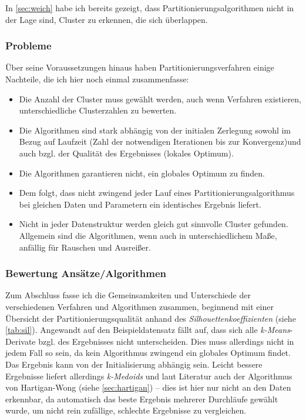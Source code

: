 \documentclass[a4paper,12pt,twoside]{article}
\newcommand{\Fachbegriff}[1]{\textit{#1}}
\begin{document}
In \ref{sec:weich} habe ich bereits gezeigt, dass Partitionierungsalgorithmen nicht in der Lage sind, Cluster zu erkennen, die sich überlappen.

\subsubsection{Probleme}
Über seine Voraussetzungen hinaus haben Partitionierungsverfahren einige Nachteile, die ich hier noch einmal zusammenfasse:
\begin{itemize}
\item Die Anzahl der Cluster muss gewählt werden, auch wenn Verfahren existieren, unterschiedliche Clusterzahlen zu bewerten.
\item Die Algorithmen sind stark abhängig von der initialen Zerlegung sowohl im Bezug auf Laufzeit (Zahl der notwendigen Iterationen bis zur Konvergenz)und auch bzgl. der Qualität des Ergebnisses (lokales Optimum).
\item Die Algorithmen garantieren nicht, ein globales Optimum zu finden.
\item Dem folgt, dass nicht zwingend jeder Lauf eines Partitionierungsalgorithmus bei gleichen Daten und Parametern ein identisches Ergebnis liefert. 
\item Nicht in jeder Datenstruktur werden gleich gut sinnvolle Cluster gefunden. Allgemein sind die Algorithmen, wenn auch in unterschiedlichem Maße, anfällig für Rauschen und Ausreißer.
\end{itemize}

\subsubsection{Bewertung Ansätze/Algorithmen}
Zum Abschluss fasse ich die Gemeinsamkeiten und Unterschiede der verschiedenen Verfahren und Algorithmen zusammen, beginnend mit einer Übersicht der Partitionierungsqualität anhand des \Fachbegriff{Silhouettenkoeffizienten} (siehe \autoref{tab:sil}). Angewandt auf den Beispieldatensatz fällt auf, dass sich alle \Fachbegriff{k-Means}-Derivate bzgl. des Ergebnisses nicht unterscheiden. Dies muss allerdings nicht in jedem Fall so sein, da  kein Algorithmus zwingend ein globales Optimum findet. Das Ergebnis kann von der Initialisierung abhängig sein. Leicht bessere Ergebnisse liefert allerdings \Fachbegriff{k-Medoids} und laut Literatur auch der Algorithmus von Hartigan-Wong (siehe \autoref{sec:hartigan}) -- dies ist hier nur nicht an den Daten erkennbar, da automatisch das beste Ergebnis mehrerer Durchläufe gewählt wurde, um nicht rein zufällige, schlechte Ergebnisse zu vergleichen. \autocite[vgl. auch][]{Saket.2016}
\end{document}
